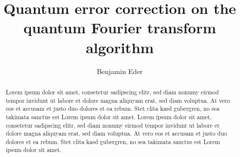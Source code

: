 \documentclass[num-refs]{wiley-networks}
\title{Quantum error correction on the quantum Fourier transform algorithm}
\author[1\authfn{1}]{Benjamin Eder}
\begin{document}
    \maketitle

    \begin{abstract}
        Lorem ipsum dolor sit amet, consetetur sadipscing elitr, sed diam nonumy eirmod tempor invidunt ut labore et dolore magna aliquyam erat, sed diam voluptua. At vero eos et accusam et justo duo dolores et ea rebum. Stet clita kasd gubergren, no sea takimata sanctus est Lorem ipsum dolor sit amet. Lorem ipsum dolor sit amet, consetetur sadipscing elitr, sed diam nonumy eirmod tempor invidunt ut labore et dolore magna aliquyam erat, sed diam voluptua. At vero eos et accusam et justo duo dolores et ea rebum. Stet clita kasd gubergren, no sea takimata sanctus est Lorem ipsum dolor sit amet.
    \end{abstract}


    \begingroup
    \hypersetup{linkcolor=black}
    \tableofcontents
    \endgroup

    \setlength{\parskip}{0.2cm}%

    
    
    
    
    
    

    \newpage

    

    \newpage

    \appendix
    
    
\end{document}
